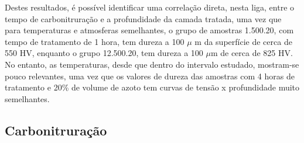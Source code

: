 \par
Destes resultados, é possível identificar uma correlação direta, nesta liga, entre o tempo de carbonitruração e a profundidade da camada tratada, uma vez que para temperaturas e atmosferas semelhantes, o grupo de amostras 1.500.20, com tempo de tratamento de 1 hora, tem dureza a 100 $\mu$ m da superfície de cerca de 550 HV, enquanto o grupo 12.500.20, tem dureza a 100 $\mu$m de cerca de 825 HV. No entanto, as temperaturas, desde que dentro do intervalo estudado, mostram-se pouco relevantes, uma vez que os valores de dureza das amostras com 4 horas de tratamento e 20\% de volume de azoto tem curvas de tensão x profundidade muito semelhantes.
\newpage
\subsection{Carbonitruração} \label{ssec:soa_tratamentos_carbonitruracao}

